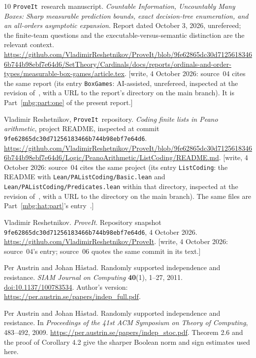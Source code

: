 \documentclass[11pt,letterpaper]{article}
\theoremstyle{definition}
\newcommand{\repo}{\texttt{ProveIt}}
\newcommand{\qrypin}{9fe62865dc30d71256183466b744b98ebf7e64d6}
\begin{document}
\begin{thebibliography}{10}
\repo\ research manuscript.
\emph{Countable Information, Uncountably Many Boxes:
Sharp measurable prediction bounds, exact decision-tree enumeration,
and an all-orders asymptotic expansion}.
Report dated October 3, 2026, unrefereed; the finite-team questions and
the executable-versus-semantic distinction are the relevant context.
\url{https://github.com/VladimirReshetnikov/ProveIt/blob/9fe62865dc30d71256183466b744b98ebf7e64d6/SetTheory/Cardinals/docs/reports/ordinals-and-order-types/measurable-box-games/article.tex}.
{\small[write, 4 October 2026: source~04 cites the same report (its entry \texttt{BoxGames}: AI-assisted, unrefereed, inspected at the revision of~\cite{qry:ProveIt}, with a URL to the report's directory on the main branch). It is Part~\ref{mbg:part:one} of the present report.]}

Vladimir Reshetnikov, \repo\ repository.
\emph{Coding finite lists in Peano arithmetic}, project README,
inspected at commit \texttt{\qrypin}.
\url{https://github.com/VladimirReshetnikov/ProveIt/blob/9fe62865dc30d71256183466b744b98ebf7e64d6/Logic/PeanoArithmetic/ListCoding/README.md}.
{\small[write, 4 October 2026: source~04 cites the same project (its entry \texttt{ListCoding}: the README with \nolinkurl{Lean/PAListCoding/Basic.lean} and \nolinkurl{Lean/PAListCoding/Predicates.lean} within that directory, inspected at the revision of~\cite{qry:ProveIt}, with a URL to the directory on the main branch). The same files are Part~\ref{mbg:hat:part}'s entry~\cite{hat:ProveItCoding}.]}

Vladimir Reshetnikov.
\emph{ProveIt}.
Repository snapshot
\texttt{9fe62865dc30d71256183466b744b98ebf7e64d6},
4 October 2026.
\url{https://github.com/VladimirReshetnikov/ProveIt}.
{\small[write, 4 October 2026: source~04's entry; source~06 quotes the same commit in its text.]}

Per Austrin and Johan H{\aa}stad.
Randomly supported independence and resistance.
\emph{SIAM Journal on Computing} \textbf{40}(1), 1--27, 2011.
\href{https://doi.org/10.1137/100783534}{doi:10.1137/100783534}.
Author's version:
\url{https://per.austrin.se/papers/indep_full.pdf}.

Per Austrin and Johan H{\aa}stad.
Randomly supported independence and resistance.
In \emph{Proceedings of the 41st ACM Symposium on Theory of Computing},
483--492, 2009.
\url{https://per.austrin.se/papers/indep_stoc.pdf}.
Theorem 2.6 and the proof of Corollary 4.2 give the sharper
Boolean norm and sign estimates used here.


\end{thebibliography}
\end{document}
